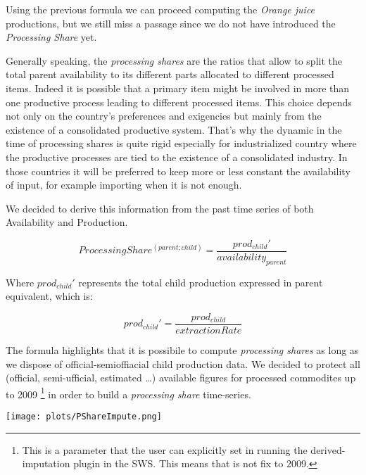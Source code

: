 \documentclass[nojss]{jss}
\begin{document}
Using the previous formula we can proceed computing the \textit{Orange juice} productions, but we still miss a passage since we do not have   introduced the \textit{Processing Share} yet.
  
  
 Generally speaking, the \textit{processing shares} are the ratios that allow to split the total parent availability to its different parts allocated to different processed items. Indeed it is possible that a primary item might be involved in more than one productive process leading to different processed  items. This choice depends not only on the country's preferences and exigencies but mainly from the existence of a consolidated productive system. That's why the dynamic in the time of processing shares is quite rigid especially for industrialized country where the productive   processes are tied to the existence of a consolidated industry. In those countries it will be preferred to keep more or less constant the   availability of input, for example importing when it is not enough.
  
We decided to derive this information from the past time series of both  Availability and Production.
  
  \begin{dmath*}
  ProcessingShare^{(parent;child)}=\frac{prod_{child}'}{availability_{parent}}
  \end{dmath*}
  
  Where $prod_{child}'$ represents the total child production expressed in parent equivalent, which is:
  
  
  
  \begin{dmath*}
  prod_{child}'=\frac{prod_{child}}{extractionRate}
  \end{dmath*}
  
  
  
  The formula highlights that it is possibile to compute \textit{processing shares} as long as we dispose of official-semioffiacial child   production data. We decided to protect all (official, semi-ufficial, estimated \dots) available figures for processed commodites up to 2009 \footnote{This is a parameter that the user can explicitly set in running the derived-imputation plugin in the SWS. This means that is not fix to 2009.} in order to build a \textit{processing share } time-series.
  
  
\texttt{[image: plots/PShareImpute.png]}
\end{document}
